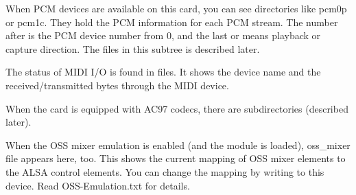 \documentclass[a4paper,8pt,english]{sphinxmanual}
\begin{document}
When PCM devices are available on this card, you can see directories
like pcm0p or pcm1c.  They hold the PCM information for each PCM
stream.  The number after  is the PCM device number from 0, and
the last  or  means playback or capture direction.  The files in
this subtree is described later.

The status of MIDI I/O is found in  files.  It shows the device
name and the received/transmitted bytes through the MIDI device.

When the card is equipped with AC97 codecs, there are 
subdirectories (described later).

When the OSS mixer emulation is enabled (and the module is loaded),
oss\_mixer file appears here, too.  This shows the current mapping of
OSS mixer elements to the ALSA control elements.  You can change the
mapping by writing to this device.  Read OSS-Emulation.txt for
details.
\end{document}
